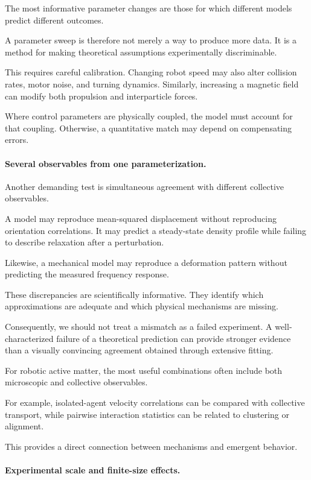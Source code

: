The most informative
parameter changes
are those for
which different
models predict
different outcomes.

A parameter sweep
is therefore not
merely a way to
produce more data.
It is a method
for making
theoretical
assumptions
experimentally
discriminable.

This requires
careful calibration.
Changing robot
speed may also
alter collision
rates, motor
noise, and
turning dynamics.
Similarly, increasing
a magnetic field
can modify both
propulsion and
interparticle forces.

Where control
parameters are
physically coupled,
the model must
account for
that coupling.
Otherwise,
a quantitative
match may depend
on compensating
errors.

\paragraph*{Several observables from one parameterization.}

Another demanding
test is simultaneous
agreement with
different collective
observables.

A model may reproduce
mean-squared displacement
without reproducing
orientation correlations.
It may predict
a steady-state
density profile
while failing
to describe
relaxation after
a perturbation.

Likewise,
a mechanical model
may reproduce
a deformation
pattern without
predicting the
measured frequency
response.

These discrepancies
are scientifically
informative.
They identify
which approximations
are adequate
and which
physical mechanisms
are missing.

Consequently,
we should not
treat a mismatch
as a failed
experiment.
A well-characterized
failure of a
theoretical prediction
can provide
stronger evidence
than a visually
convincing agreement
obtained through
extensive fitting.

For robotic
active matter,
the most useful
combinations often
include both
microscopic and
collective observables.

For example,
isolated-agent
velocity correlations
can be compared
with collective
transport,
while pairwise
interaction statistics
can be related
to clustering
or alignment.

This provides
a direct connection
between mechanisms
and emergent
behavior.

\paragraph*{Experimental scale and finite-size effects.}

